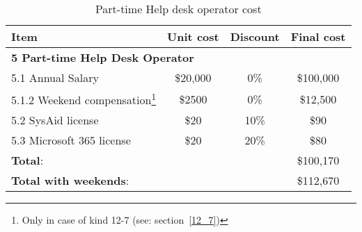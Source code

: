 \begin{minipage}{15cm}
	\begin{table}[H]
		\centering
		\begin{tabular}{|l|c|c|c|} 
			\hline
			\textbf{Item} & \textbf{Unit cost} & \textbf{Discount} & \textbf{Final cost}   \\
			\hline
			\multicolumn{4}{|l|}{\textbf{5 Part-time Help Desk Operator}}\\
			\hline
			\hspace{2mm}5.1  Annual Salary & \$20,000 & 0\% & \$100,000\\
			\hline
			\hspace{4mm}5.1.2 Weekend compensation\footnote{Only in case of kind 12{-}7 (see: section~\ref{12_7})}& \$2500 & 0\% & \$12,500 \\
			\hline
			\hspace{2mm}5.2 SysAid license & \$20 & 10\% & \$90 \\
			\hline
			\hspace{2mm}5.3 Microsoft 365 license  & \$20 & 20\% & \$80 \\
			\hline
			\multicolumn{3}{|l|}{\textbf{Total}:} & \$100,170\\
			\hline
			\multicolumn{3}{|l|}{\textbf{Total with weekends}:} & \$112,670\\
			\hline
		\end{tabular}
		\caption{Part-time Help desk operator cost}\label{tab:part_time_operator_cost}
	\end{table}
\end{minipage}

